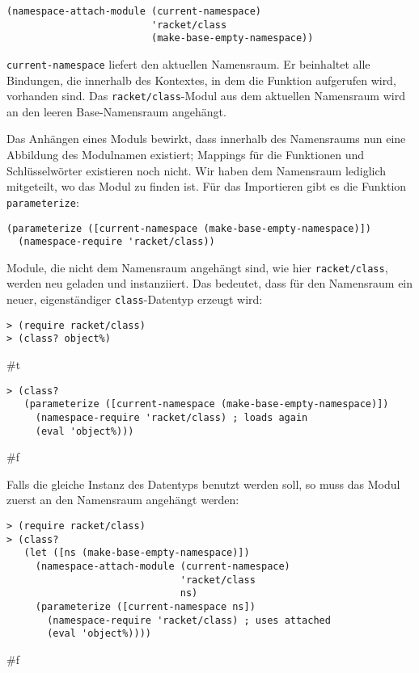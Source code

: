 \begin{lstlisting}
(namespace-attach-module (current-namespace)
                         'racket/class
                         (make-base-empty-namespace))
\end{lstlisting}

\texttt{current-namespace} liefert den aktuellen Namensraum. Er beinhaltet alle Bindungen, die innerhalb des Kontextes, in dem die Funktion aufgerufen wird, vorhanden sind. Das \texttt{racket/class}-Modul aus dem aktuellen Namensraum wird an den leeren Base-Namensraum angehängt.

Das Anhängen eines Moduls bewirkt, dass innerhalb des Namensraums nun eine Abbildung des Modulnamen existiert; Mappings für die Funktionen und Schlüsselwörter existieren noch nicht. Wir haben dem Namensraum lediglich mitgeteilt, wo das Modul zu finden ist. Für das Importieren gibt es die Funktion \texttt{parameterize}:

\begin{lstlisting}
(parameterize ([current-namespace (make-base-empty-namespace)])
  (namespace-require 'racket/class))
\end{lstlisting}

Module, die nicht dem Namensraum angehängt sind, wie hier \texttt{racket/class}, werden neu geladen und instanziiert. Das bedeutet, dass für den Namensraum ein neuer, eigenständiger \texttt{class}-Datentyp erzeugt wird:

\begin{lstlisting}
> (require racket/class)
> (class? object%)
\end{lstlisting}
{\routput \#t}

\begin{lstlisting}
> (class?
   (parameterize ([current-namespace (make-base-empty-namespace)])
     (namespace-require 'racket/class) ; loads again
     (eval 'object%)))
\end{lstlisting}
{\routput \#f}

Falls die gleiche Instanz des Datentyps benutzt werden soll, so muss das Modul zuerst an den Namensraum angehängt werden:

\begin{lstlisting}
> (require racket/class)
> (class?
   (let ([ns (make-base-empty-namespace)])
     (namespace-attach-module (current-namespace)
                              'racket/class
                              ns)
     (parameterize ([current-namespace ns])
       (namespace-require 'racket/class) ; uses attached
       (eval 'object%))))
\end{lstlisting}
{\routput \#f}

